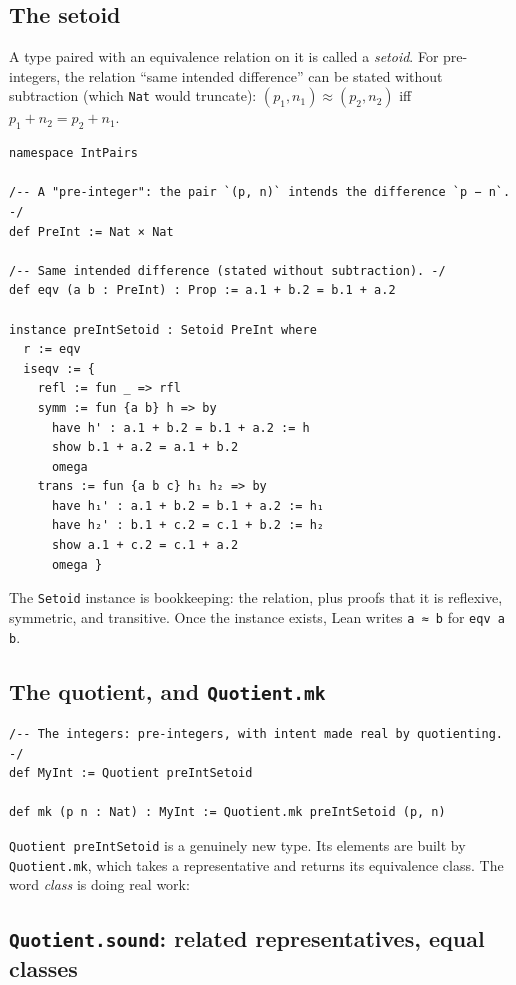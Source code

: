\documentclass[12pt, a4paper, openright]{book}
\theoremstyle{thmstyle}
\theoremstyle{defstyle}
\newcommand{\lc}[1]{\texttt{#1}}
\begin{document}
\subsection{The setoid}

A type paired with an equivalence relation on it is called a
\emph{setoid}. For pre-integers, the relation ``same intended difference''
can be stated without subtraction (which \lc{Nat} would truncate):
$(p_1, n_1) \approx (p_2, n_2)$ iff $p_1 + n_2 = p_2 + n_1$.

\begin{verbatim}
namespace IntPairs

/-- A "pre-integer": the pair `(p, n)` intends the difference `p − n`. -/
def PreInt := Nat × Nat

/-- Same intended difference (stated without subtraction). -/
def eqv (a b : PreInt) : Prop := a.1 + b.2 = b.1 + a.2

instance preIntSetoid : Setoid PreInt where
  r := eqv
  iseqv := {
    refl := fun _ => rfl
    symm := fun {a b} h => by
      have h' : a.1 + b.2 = b.1 + a.2 := h
      show b.1 + a.2 = a.1 + b.2
      omega
    trans := fun {a b c} h₁ h₂ => by
      have h₁' : a.1 + b.2 = b.1 + a.2 := h₁
      have h₂' : b.1 + c.2 = c.1 + b.2 := h₂
      show a.1 + c.2 = c.1 + a.2
      omega }
\end{verbatim}

The \lc{Setoid} instance is bookkeeping: the relation, plus proofs that it
is reflexive, symmetric, and transitive. Once the instance exists, Lean
writes \lc{a ≈ b} for \lc{eqv a b}.

\subsection{The quotient, and \texttt{Quotient.mk}}

\begin{verbatim}
/-- The integers: pre-integers, with intent made real by quotienting. -/
def MyInt := Quotient preIntSetoid

def mk (p n : Nat) : MyInt := Quotient.mk preIntSetoid (p, n)
\end{verbatim}

\lc{Quotient preIntSetoid} is a genuinely new type. Its elements are
built by \lc{Quotient.mk}, which takes a representative and returns its
equivalence class. The word \emph{class} is doing real work:

\subsection{\texttt{Quotient.sound}: related representatives, equal classes}
\end{document}

